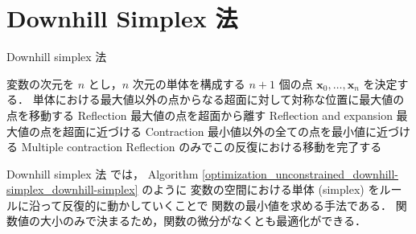 %

\section{Downhill Simplex 法}

\begin{algorithm}[tp]
    \caption{Downhill simplex 法}
    \label{optimization_unconstrained_downhill-simplex_downhill-simplex}
    \begin{algorithmic}
            \State 変数の次元を $n$ とし，$n$ 次元の単体を構成する
                $n + 1$ 個の点 $\bm{x}_0, \ldots, \bm{x}_{n}$ を決定する．
            \Loop
                \State 単体における最大値以外の点からなる超面に対して対称な位置に最大値の点を移動する
                \Comment Reflection
                    \State 最大値の点を超面から離す
                    \Comment Reflection and expansion
                    \State 最大値の点を超面に近づける
                    \Comment Contraction
                        \State 最小値以外の全ての点を最小値に近づける
                        \Comment Multiple contraction
                    \EndIf
                \Else
                    \State Reflection のみでこの反復における移動を完了する
                \EndIf
                    \State \Return
                \EndIf
            \EndLoop
        \EndProcedure
    \end{algorithmic}
\end{algorithm}

Downhill simplex 法 \cite{Press2007} では，
Algorithm \ref{optimization_unconstrained_downhill-simplex_downhill-simplex} のように
変数の空間における単体 (simplex) をルールに沿って反復的に動かしていくことで
関数の最小値を求める手法である．
関数値の大小のみで決まるため，関数の微分がなくとも最適化ができる．
